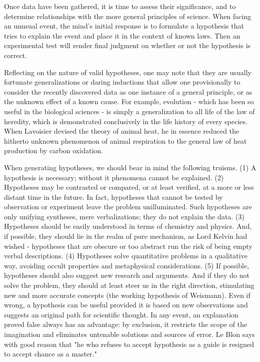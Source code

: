 \documentclass{article}
\begin{document}
Once data have been gathered, it is time to assess their significance, and to determine relationships with the more general principles of science. When facing an unusual event, the mind’s initial response is to formulate a hypothesis that tries to explain the event and place it in the context of known laws. Then an experimental test will render final judgment on whether or not the hypothesis is correct.

Reflecting on the nature of valid hypotheses, one may note that they are usually fortunate generalizations or daring inductions that allow one provisionally to consider the recently discovered data as one instance of a general principle, or as the unknown effect of a known cause. For example, evolution - which has been so useful in the biological sciences - is simply a generalization to all life of the law of heredity, which is demonstrated conclusively in the life history of every species. When Lavoisier devised the theory of animal heat, he in essence reduced the hitherto unknown phenomenon of animal respiration to the general law of heat production by carbon oxidation.

When generating hypotheses, we should bear in mind the following truisms. (1) A hypothesis is necessary; without it phenomena cannot be explained. (2) Hypotheses may be contrasted or compared, or at least verified, at a more or less distant time in the future. In fact, hypotheses that cannot be tested by observation or experiment leave the problem unilluminated. Such hypotheses are only unifying syntheses, mere verbalizations; they do not explain the data. (3) Hypotheses should be easily understood in terms of chemistry and physics. And, if possible, they should lie in the realm of pure mechanism, as Lord Kelvin had wished - hypotheses that are obscure or too abstract run the risk of being empty verbal descriptions. (4) Hypotheses solve quantitative problems in a qualitative way, avoiding occult properties and metaphysical considerations. (5) If possible, hypotheses should also suggest new research and arguments. And if they do not solve the problem, they should at least steer us in the right direction, stimulating new and more accurate concepts (the working hypothesis of Weismann). Even if wrong, a hypothesis can be useful provided it is based on new observations and suggests an original path for scientific thought. In any event, an explanation proved false always has an advantage: by exclusion, it restricts the scope of the imagination and eliminates untenable solutions and sources of error. Le Blon says with good reason that "he who refuses to accept hypothesis as a guide is resigned to accept chance as a master."
\end{document}
